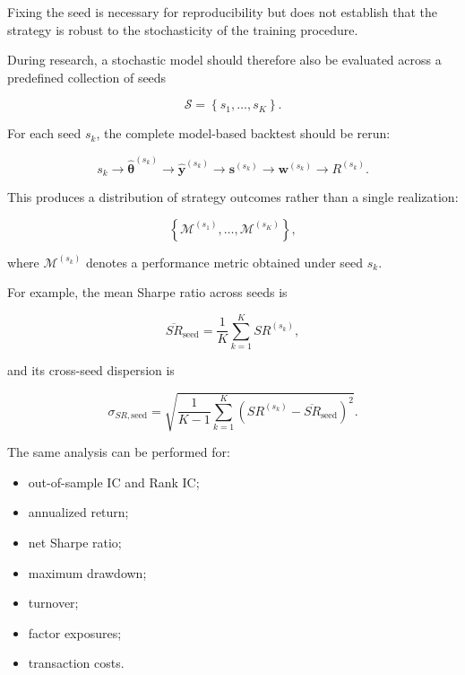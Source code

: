 \documentclass[11pt,a4paper]{article}
\begin{document}
Fixing the seed is necessary for reproducibility but does not establish that the
strategy is robust to the stochasticity of the training procedure.

During research, a stochastic model should therefore also be evaluated across a
predefined collection of seeds

\begin{equation}
\mathcal{S}
=
\left\{
s_1,\ldots,s_K
\right\}.
\end{equation}

For each seed $s_k$, the complete model-based backtest should be rerun:

\begin{equation}
s_k
\rightarrow
\widehat{\boldsymbol{\theta}}^{(s_k)}
\rightarrow
\widehat{\mathbf{y}}^{(s_k)}
\rightarrow
\mathbf{s}^{(s_k)}
\rightarrow
\mathbf{w}^{(s_k)}
\rightarrow
R^{(s_k)}.
\end{equation}

This produces a distribution of strategy outcomes rather than a single
realization:

\begin{equation}
\boxed{
\left\{
\mathcal{M}^{(s_1)},
\ldots,
\mathcal{M}^{(s_K)}
\right\},
}
\end{equation}

where $\mathcal{M}^{(s_k)}$ denotes a performance metric obtained under seed
$s_k$.

For example, the mean Sharpe ratio across seeds is

\begin{equation}
\boxed{
\overline{SR}_{\mathrm{seed}}
=
\frac{1}{K}
\sum_{k=1}^{K}
SR^{(s_k)},
}
\end{equation}

and its cross-seed dispersion is

\begin{equation}
\boxed{
\sigma_{SR,\mathrm{seed}}
=
\sqrt{
\frac{1}{K-1}
\sum_{k=1}^{K}
\left(
SR^{(s_k)}
-
\overline{SR}_{\mathrm{seed}}
\right)^2
}.
}
\end{equation}

The same analysis can be performed for:

\begin{itemize}
    \item out-of-sample IC and Rank IC;
    \item annualized return;
    \item net Sharpe ratio;
    \item maximum drawdown;
    \item turnover;
    \item factor exposures;
    \item transaction costs.
\end{itemize}
\end{document}
